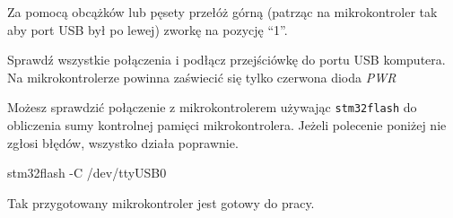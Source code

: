 \documentclass{pdfBooklets}
\begin{document}
Za pomocą obcążków lub pęsety przełóż górną (patrząc na mikrokontroler tak aby port USB był po lewej) zworkę na
pozycję ``1''.

Sprawdź wszystkie połączenia i podłącz przejściówkę do portu USB komputera. Na mikrokontrolerze powinna zaświecić się tylko czerwona dioda
\textit{PWR}

Możesz sprawdzić połączenie z mikrokontrolerem używając \Verb$stm32flash$ do obliczenia sumy kontrolnej pamięci mikrokontrolera.
Jeżeli polecenie poniżej nie zgłosi błędów, wszystko działa poprawnie.

\begin{CodeFrame*}[bash]{}
stm32flash -C /dev/ttyUSB0
\end{CodeFrame*}

Tak przygotowany mikrokontroler jest gotowy do pracy.
\end{document}
